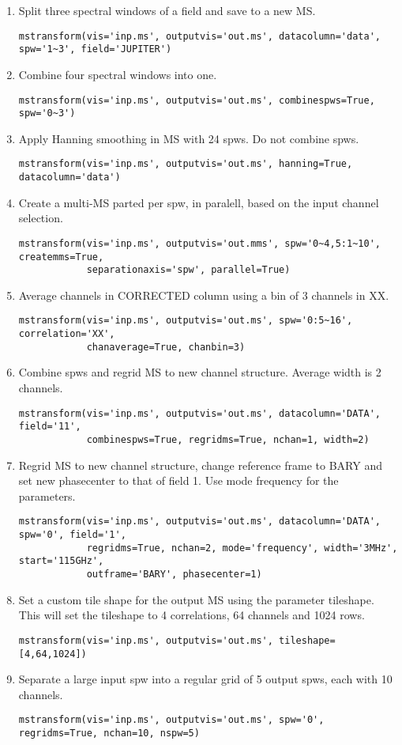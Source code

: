 \begin{enumerate}
\item Split three spectral windows of a field and save to a new MS.
\begin{verbatim}
mstransform(vis='inp.ms', outputvis='out.ms', datacolumn='data', spw='1~3', field='JUPITER')
\end{verbatim}
\item Combine four spectral windows into one.
\begin{verbatim}
mstransform(vis='inp.ms', outputvis='out.ms', combinespws=True, spw='0~3')
\end{verbatim}
\item Apply Hanning smoothing in MS with 24 spws. Do not combine spws.
\begin{verbatim}
mstransform(vis='inp.ms', outputvis='out.ms', hanning=True, datacolumn='data')
\end{verbatim}
\item Create a multi-MS parted per spw, in paralell, based on the input channel selection.
\begin{verbatim}
mstransform(vis='inp.ms', outputvis='out.mms', spw='0~4,5:1~10', createmms=True,
            separationaxis='spw', parallel=True)
\end{verbatim}
\item Average channels in CORRECTED column using a bin of 3 channels in XX.
\begin{verbatim}
mstransform(vis='inp.ms', outputvis='out.ms', spw='0:5~16', correlation='XX', 
            chanaverage=True, chanbin=3)
\end{verbatim}
\item Combine spws and regrid MS to new channel structure. Average width is 2 channels.
\begin{verbatim}
mstransform(vis='inp.ms', outputvis='out.ms', datacolumn='DATA', field='11',
            combinespws=True, regridms=True, nchan=1, width=2)
\end{verbatim}
\item Regrid MS to new channel structure, change reference frame to BARY and set
new phasecenter to that of field 1. Use mode frequency for the parameters.
\begin{verbatim}
mstransform(vis='inp.ms', outputvis='out.ms', datacolumn='DATA', spw='0', field='1', 
            regridms=True, nchan=2, mode='frequency', width='3MHz', start='115GHz', 
            outframe='BARY', phasecenter=1)
\end{verbatim}
\item Set a custom tile shape for the output MS using the parameter tileshape. This will
set the tileshape to 4 correlations, 64 channels and 1024 rows.
\begin{verbatim}
mstransform(vis='inp.ms', outputvis='out.ms', tileshape=[4,64,1024])
\end{verbatim}
\item Separate a large input spw into a regular grid of 5 output spws, each with 10 channels.
\begin{verbatim}
mstransform(vis='inp.ms', outputvis='out.ms', spw='0', regridms=True, nchan=10, nspw=5)
\end{verbatim}




\end{enumerate}
